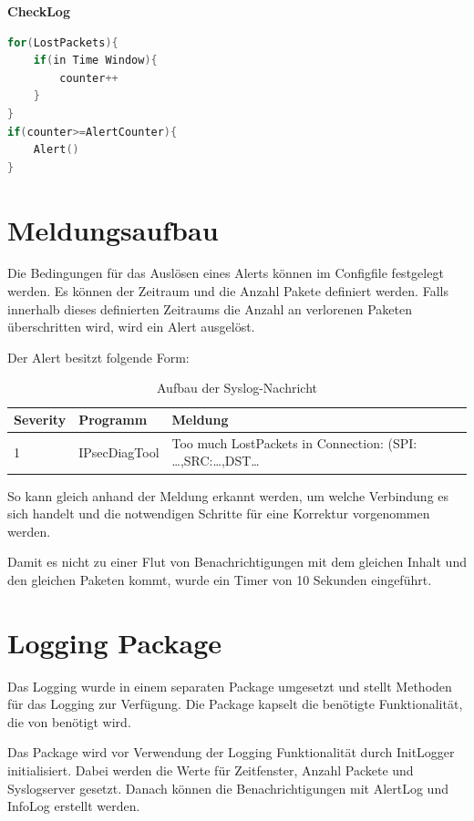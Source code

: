 \textbf{CheckLog}
\begin{lstlisting}[language=go]
for(LostPackets){
	if(in Time Window){
		counter++
	}
}
if(counter>=AlertCounter){
	Alert()
}
\end{lstlisting}


\section{ Meldungsaufbau}

\noindent Die Bedingungen für das Auslösen eines Alerts können im Configfile festgelegt werden. Es können der Zeitraum und die Anzahl Pakete definiert werden. Falls innerhalb dieses definierten Zeitraums die Anzahl an verlorenen Paketen überschritten wird, wird ein Alert ausgelöst.

\noindent Der Alert besitzt folgende Form:

\begin{table}[H]
\begin{tabularx}{\textwidth}{l|l|>{\raggedright\arraybackslash}X} 
\textbf{Severity} & \textbf{Programm} & \textbf{Meldung}\\ 
\hline
1 & IPsecDiagTool & Too much LostPackets in Connection: (SPI: \dots ,SRC:\dots ,DST\dots
\end{tabularx}
\caption{Aufbau der Syslog-Nachricht}
\end{table}

\noindent So kann gleich anhand der Meldung erkannt werden, um welche Verbindung es sich handelt und die notwendigen Schritte für eine Korrektur vorgenommen werden.

\noindent Damit es nicht zu einer Flut von Benachrichtigungen mit dem gleichen Inhalt und den gleichen Paketen kommt, wurde ein Timer von 10 Sekunden eingeführt.

\section{ Logging Package}

\noindent Das Logging wurde in einem separaten Package umgesetzt und stellt Methoden für das Logging zur Verfügung. Die Package kapselt die benötigte Funktionalität, die von  benötigt wird.

\noindent Das Package wird vor Verwendung der Logging Funktionalität durch InitLogger initialisiert. Dabei werden die Werte für Zeitfenster, Anzahl Packete und Syslogserver gesetzt. Danach können die Benachrichtigungen mit AlertLog und InfoLog erstellt werden.

